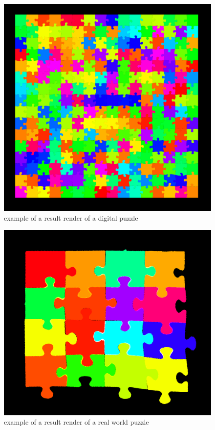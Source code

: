 \documentclass{article}
\begin{document}
\begin{figure}[h]
  \caption{example of a result render of a digital puzzle}\label{fig:result_digital}
  \centering
  \includegraphics[height=0.6\textwidth]{pictures/result_digital.png}
\end{figure}

\begin{figure}[h]
  \caption{example of a result render of a real world puzzle}\label{fig:result_real}
  \centering
  \includegraphics[height=0.6\textwidth]{pictures/result_real.png}
\end{figure}
\end{document}
